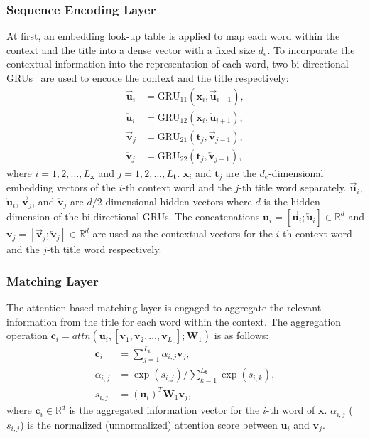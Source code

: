 \documentclass[letterpaper]{article} %
\begin{document}
\subsubsection{Sequence Encoding Layer}
At first, an embedding look-up table is applied to map each word within the context and the title into a dense vector with a fixed size $d_e$. To incorporate the contextual information into the representation of each word, two bi-directional GRUs~\cite{cho2014learning} are used to encode the context and the title respectively:
\begin{align}
\overrightarrow{\textbf{u}}_i &= \text{GRU}_{11}(\textbf{x}_i, \overrightarrow{\textbf{u}}_{i-1}), \\
\overleftarrow{\textbf{u}}_i  &= \text{GRU}_{12}(\textbf{x}_i, \overleftarrow{\textbf{u}}_{i+1}), \\
\overrightarrow{\textbf{v}}_j &= \text{GRU}_{21}(\textbf{t}_j, \overrightarrow{\textbf{v}}_{j-1}),\\
\overleftarrow{\textbf{v}}_j  &= \text{GRU}_{22}(\textbf{t}_j, \overleftarrow{\textbf{v}}_{j+1}),
\end{align}
where $i=1,2,\dots,L_{\mathbf{x}}$ and $j=1,2,\dots,L_{\mathbf{t}}$. $\mathbf{x}_i$ and $\mathbf{t}_j$ are the $d_e$-dimensional embedding vectors of the $i$-th context word and the $j$-th title word separately. $\overrightarrow{\textbf{u}}_i$, $\overleftarrow{\textbf{u}}_i$, $\overrightarrow{\textbf{v}}_j$, and $\overleftarrow{\textbf{v}}_j$ are $d/2$-dimensional hidden vectors where $d$ is the hidden dimension of the bi-directional GRUs. The concatenations $\mathbf{u}_i = [\overrightarrow{\mathbf{u}}_i; \overleftarrow{\mathbf{u}}_i] \in \mathbb{R}^d$ and $\mathbf{v}_j = [\overrightarrow{\mathbf{v}}_j; \overleftarrow{\mathbf{v}}_j] \in \mathbb{R}^d$ are used as the contextual vectors for the $i$-th context word and the $j$-th title word respectively.

\subsubsection{Matching Layer}
The attention-based matching layer is engaged to aggregate the relevant information from the title for each word within the context. The aggregation operation $\mathbf{c}_i = attn(\mathbf{u}_i, [\mathbf{v}_1, \mathbf{v}_2,\dots, \mathbf{v}_{L_{\mathbf{t}}}]; \mathbf{W}_1)$ is as follows:
\begin{align}
\mathbf{c}_i &=  \sum_{j=1}^{L_{\mathbf{t}}} \alpha_{i,j} \mathbf{v}_j, \\
\alpha_{i,j} &= \exp(s_{i,j}) \slash \sum_{k=1}^{L_{\mathbf{t}}} \exp(s_{i,k}),\\
s_{i,j} &= (\mathbf{u}_i)^T \mathbf{W}_1 \mathbf{v}_j,
\end{align}
where $\mathbf{c}_i \in \mathbb{R}^d$ is the aggregated information vector for the $i$-th word of $\mathbf{x}$. $\alpha_{i,j}$ ($s_{i,j}$) is the normalized (unnormalized) attention score between $\mathbf{u}_i$ and $\mathbf{v}_j$.
\end{document}
